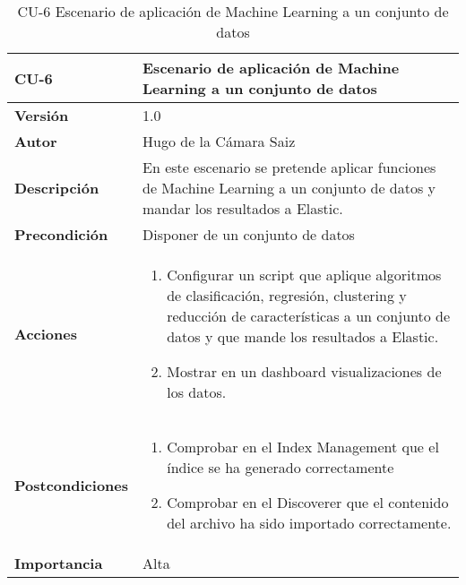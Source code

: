 \begin{table}[p]
	\centering
	\begin{tabularx}{\linewidth}{ p{} p{} }
		\toprule
		\textbf{CU-6}    & \textbf{Escenario de aplicación de Machine Learning a un conjunto de datos}\\
		\toprule
		\textbf{Versión}              & 1.0    \\
		\textbf{Autor}                & Hugo de la Cámara Saiz \\
		\textbf{Descripción}          & En este escenario se pretende aplicar funciones de Machine Learning a un conjunto de datos y mandar los resultados a Elastic. \\
		\textbf{Precondición}         & Disponer de un conjunto de datos  \\
		\textbf{Acciones}             &
		\begin{enumerate}
			\def\labelenumi{\arabic{enumi}.}
			\tightlist
			\item Configurar un script que aplique algoritmos de clasificación, regresión, clustering y reducción de características a un conjunto de datos y que mande los resultados a Elastic.
                \item Mostrar en un dashboard visualizaciones de los datos.
		\end{enumerate}\\
                \textbf{Postcondiciones}             &
		\begin{enumerate}
			\def\labelenumi{\arabic{enumi}.}
			\tightlist
			\item Comprobar en el Index Management que el índice se ha generado correctamente
			\item Comprobar en el Discoverer que el contenido del archivo ha sido importado correctamente.
		\end{enumerate}\\
		\textbf{Importancia}          & Alta \\
		\bottomrule
	\end{tabularx}
	\caption{CU-6 Escenario de aplicación de Machine Learning a un conjunto de datos}
\end{table}